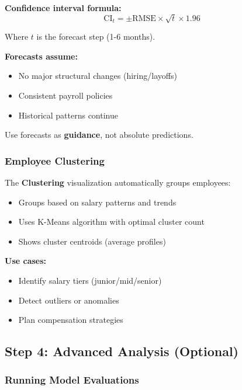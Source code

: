 \documentclass[11pt,a4paper]{article}
\begin{document}
\textbf{Confidence interval formula:}
\begin{equation}
\text{CI}_t = \pm \text{RMSE} \times \sqrt{t} \times 1.96
\end{equation}

Where $t$ is the forecast step (1-6 months).

\begin{warningbox}[title=Forecast Limitations]
\textbf{Forecasts assume:}
\begin{itemize}
    \item No major structural changes (hiring/layoffs)
    \item Consistent payroll policies
    \item Historical patterns continue
\end{itemize}
Use forecasts as \textbf{guidance}, not absolute predictions.
\end{warningbox}

\subsubsection{Employee Clustering}

The \textbf{Clustering} visualization automatically groups employees:

\begin{itemize}[leftmargin=*]
    \item Groups based on salary patterns and trends
    \item Uses K-Means algorithm with optimal cluster count
    \item Shows cluster centroids (average profiles)
\end{itemize}

\textbf{Use cases:}
\begin{itemize}[leftmargin=*]
    \item Identify salary tiers (junior/mid/senior)
    \item Detect outliers or anomalies
    \item Plan compensation strategies
\end{itemize}

\newpage

\subsection{Step 4: Advanced Analysis (Optional)}

\subsubsection{Running Model Evaluations}
\end{document}
